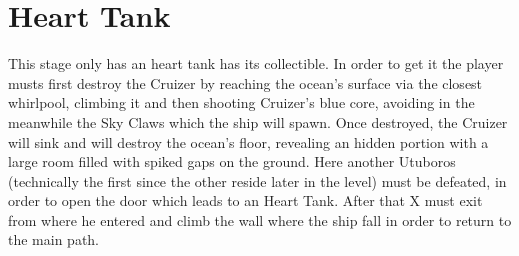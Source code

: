 \section{Heart Tank}
This stage only has an heart tank has its collectible. In order to get it the player musts first destroy the Cruizer by reaching the ocean's surface via the closest whirlpool, climbing it and then shooting Cruizer's blue core, avoiding in the meanwhile the Sky Claws which the ship will spawn. Once destroyed, the Cruizer will sink and will destroy the ocean's floor, revealing an hidden portion with a large room filled with spiked gaps on the ground. Here another Utuboros (technically the first since the other reside later in the level) must be defeated, in order to open the door which leads to an Heart Tank. After that X must exit from where he entered and climb the wall where the ship fall in order to return to the main path.
